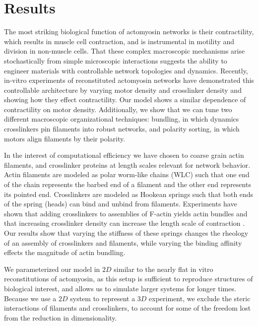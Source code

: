\documentclass[12pt]{article} \usepackage{times} \usepackage{graphicx}
\begin{document}
\section{Results} The most striking biological function of actomyosin networks
is their contractility, which results in muscle cell contraction, and is
instrumental in motility and division in non-muscle cells.  That these complex
macroscopic mechanisms arise stochastically from simple microscopic
interactions suggests the ability to engineer materials with controllable
network topologies and dynamics.  Recently, in-vitro experiments of
reconstituted actomyosin networks have demonstrated this controllable
architecture by varying motor density and crosslinker density and showing how
they effect contractility\cite{murrell2012, murrell2014}. Our model shows a
similar dependence of contractility on motor density.  Additionally, we show
that we can tune two different macroscopic organizational techniques: bundling,
in which dynamics crosslinkers pin filaments into robust networks, and polarity
sorting, in which motors align filaments by their polarity.  \par In the
interest of computational efficiency we have chosen to coarse grain actin
filaments, and crosslinker proteins at length scales relevant for network
behavior. Actin filaments are modeled as polar worm-like chains (WLC) such that
one end of the chain represents the barbed end of a filament and the other end
represents its pointed end. Crosslinkers are modeled as Hookean springs such
that both ends of the spring (heads) can bind and unbind from filaments.
Experiments have shown that adding crosslinkers to assemblies of F-actin yields
actin bundles \cite{gardel2004, murrell2012, murrell2014} and that increasing
crosslinker density can increase the length scale of contraction
\cite{murrell2012}. Our results show that varying the stiffness of these
springs changes the rheology of an assembly of crosslinkers and filaments,
while varying the binding affinity effects the magnitude of actin bundling.
\par We parameterized our model in $2D$ similar to the nearly flat in vitro
reconstitutions of actomyosin, as this setup is sufficient to reproduce
structures of biological interest, and allows us to simulate larger systems for
longer times.  Because we use a $2D$ system to represent a $3D$ experiment, we
exclude the steric interactions of filaments and crosslinkers, to account for
some of the freedom lost from the reduction in dimensionality.
\end{document}
